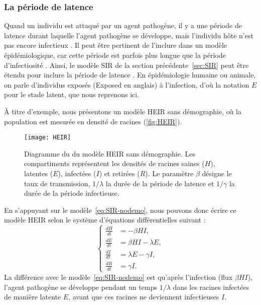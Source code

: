 \subsubsection{La période de latence}
\label{sec:latence}
	
	Quand un individu est attaqué par un agent pathogène, il y a une période de latence durant laquelle l’agent pathogène se développe, mais l’individu hôte n’est pas encore infectieux \citep{Madden2007}. Il peut être pertinent de l'inclure dans un modèle épidémiologique, car cette période  est parfois  plus longue que la période d'infectiosité  \citep{Vanderplank1963}. Ainsi, le modèle SIR de la section précédente~\ref{sec:SIR} peut être étendu pour inclure la période de latence \citep[par exemple]{Dieckmann2000}. En épidémiologie humaine ou animale, on parle d'individus exposés (\og Exposed \fg{} en anglais) à l'infection, d'où la notation  $E$ pour le stade latent, que nous reprenons ici.
	
	À titre d'exemple, nous présentons un modèle HEIR sans démographie, où la population est mesurée en densité de racines (\autoref{fig:HEIR}). 
	
	\begin{figure}[ht]
	  \centering
		  \texttt{[image: HEIR]}
		  \caption[Diagramme du modèle du modèle HEIR sans démographie]{Diagramme du du modèle HEIR sans démographie.  
		  Les compartiments  représentent les densités  de  racines saines ($H$), latentes  ($E$), infectées ($I$) et 
		  retirées  ($R$).
		  Le paramètre $\beta$ désigne le taux de transmission, $1/\lambda$  la durée de la période de latence et $1/
		  \gamma$ la durée de la période infectieuse.}
		  \label{fig:HEIR}
	\end{figure}
	
	En s'appuyant sur le modèle~\eqref{eq:SIR-nodemo}, nous pouvons donc écrire ce modèle HEIR selon le système d'équations différentielles suivant :
	\begin{equation}
	  \left\{
	    \begin{aligned}
	      \frac{dH}{dt} &= -\beta H I,\\
	      \frac{dE}{dt} &= \beta H I  - \lambda E, \\         
	      \frac{dI}{dt} &= \lambda E -  \gamma  I, \\
	      \frac{dR}{dt} &= \gamma I.  
	    \end{aligned}
	  \right.
	  \label{eq:HEIR}
	\end{equation}
	La différence avec le modèle~\eqref{eq:SIR-nodemo} est qu'après l'infection (flux $\beta H I$), l'agent pathogène se développe  pendant un temps $1/\lambda$ dans les racines infectées de manière latente $E$, avant que ces racines ne deviennent infectieuses $I$.
	
